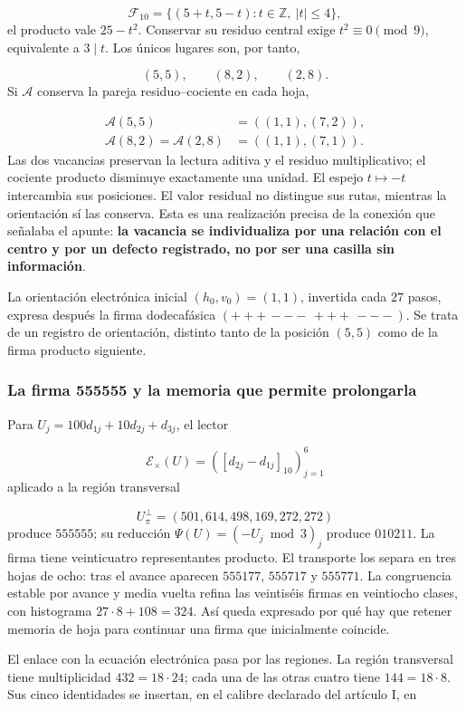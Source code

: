 \[
\mathcal F_{10}=\{(5+t,5-t):t\in\mathbb Z,\ |t|\leq4\},
\]
el producto vale \(25-t^2\). Conservar su residuo central exige \(t^2\equiv0\pmod9\), equivalente a \(3\mid t\). Los únicos lugares son, por tanto,

\[
(5,5),\qquad(8,2),\qquad(2,8).
\]
Si \(\mathcal A\) conserva la pareja residuo–cociente en cada hoja,

\[
\begin{aligned}
\mathcal A(5,5)&=((1,1),(7,2)),\\
\mathcal A(8,2)=\mathcal A(2,8)&=((1,1),(7,1)).
\end{aligned}
\]
Las dos vacancias preservan la lectura aditiva y el residuo multiplicativo; el cociente producto disminuye exactamente una unidad. El espejo \(t\mapsto-t\) intercambia sus posiciones. El valor residual no distingue sus rutas, mientras la orientación sí las conserva. Esta es una realización precisa de la conexión que señalaba el apunte: \textbf{la vacancia se individualiza por una relación con el centro y por un defecto registrado, no por ser una casilla sin información}.

La orientación electrónica inicial \((h_0,v_0)=(1,1)\), invertida cada \(27\) pasos, expresa después la firma dodecafásica \((+++\,---\,+++\,---)\). Se trata de un registro de orientación, distinto tanto de la posición \((5,5)\) como de la firma producto siguiente.

\subsubsection*{La firma 555555 y la memoria que permite prolongarla}
Para \(U_j=100d_{1j}+10d_{2j}+d_{3j}\), el lector

\[
\mathcal E_\times(U)=([d_{2j}-d_{1j}]_{10})_{j=1}^{6}
\]
aplicado a la región transversal

\[
U_\pi^\perp=(501,614,498,169,272,272)
\]
produce \(555555\); su reducción \(\Psi(U)=(-U_j\bmod3)_j\) produce \(010211\). La firma tiene veinticuatro representantes producto. El transporte los separa en tres hojas de ocho: tras el avance aparecen \(555177\), \(555717\) y \(555771\). La congruencia estable por avance y media vuelta refina las veintiséis firmas en veintiocho clases, con histograma \(27\cdot8+108=324\). Así queda expresado por qué hay que retener memoria de hoja para continuar una firma que inicialmente coincide.



El enlace con la ecuación electrónica pasa por las regiones. La región transversal tiene multiplicidad \(432=18\cdot24\); cada una de las otras cuatro tiene \(144=18\cdot8\). Sus cinco identidades se insertan, en el calibre declarado del artículo I, en

